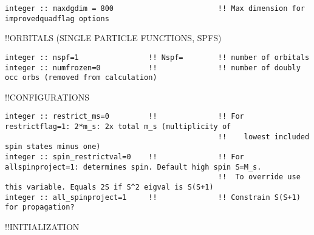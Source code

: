 \begin{verbatim}
integer :: maxdgdim = 800                        !! Max dimension for improvedquadflag options
\end{verbatim}
!!{\large \quad ORBITALS (SINGLE PARTICLE FUNCTIONS, SPFS)}
\begin{verbatim}
integer :: nspf=1                !! Nspf=        !! number of orbitals
integer :: numfrozen=0           !!              !! number of doubly occ orbs (removed from calculation)
\end{verbatim}
!!{\large \quad CONFIGURATIONS}
\begin{verbatim}
integer :: restrict_ms=0         !!              !! For restrictflag=1: 2*m_s: 2x total m_s (multiplicity of 
                                                 !!    lowest included spin states minus one)
integer :: spin_restrictval=0    !!              !! For allspinproject=1: determines spin. Default high spin S=M_s.
                                                 !!  To override use this variable. Equals 2S if S^2 eigval is S(S+1)
integer :: all_spinproject=1     !!              !! Constrain S(S+1) for propagation?
\end{verbatim}
!!{\large \quad INITIALIZATION}
